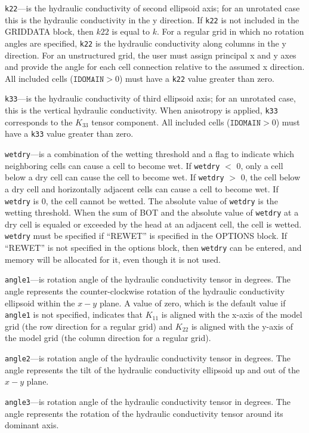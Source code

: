 \item \texttt{k22}---is the hydraulic conductivity of second ellipsoid axis; for an unrotated case this is the hydraulic conductivity in the y direction.  If \texttt{k22} is not included in the GRIDDATA block, then $k22$ is equal to $k$.  For a regular grid in which no rotation angles are specified, \texttt{k22} is the hydraulic conductivity along columns in the y direction. For an unstructured grid, the user must assign principal x and y axes and provide the angle for each cell connection relative to the assumed x direction.  All included cells ($\texttt{IDOMAIN} > 0$) must have a \texttt{k22} value greater than zero.

\item \texttt{k33}---is the hydraulic conductivity of third ellipsoid axis; for an unrotated case, this is the vertical hydraulic conductivity.  When anisotropy is applied, \texttt{k33} corresponds to the $K_{33}$ tensor component.  All included cells ($\texttt{IDOMAIN} > 0$) must have a \texttt{k33} value greater than zero.

\item \texttt{wetdry}---is a combination of the wetting threshold and a flag to indicate which neighboring cells can cause a cell to become wet. If \texttt{wetdry} $<$ 0, only a cell below a dry cell can cause the cell to become wet. If \texttt{wetdry} $>$ 0, the cell below a dry cell and horizontally adjacent cells can cause a cell to become wet. If \texttt{wetdry} is 0, the cell cannot be wetted. The absolute value of \texttt{wetdry} is the wetting threshold. When the sum of BOT and the absolute value of \texttt{wetdry} at a dry cell is equaled or exceeded by the head at an adjacent cell, the cell is wetted.  \texttt{wetdry} must be specified if ``REWET'' is specified in the OPTIONS block.  If ``REWET'' is not specified in the options block, then \texttt{wetdry} can be entered, and memory will be allocated for it, even though it is not used.

\item \texttt{angle1}---is rotation angle of the hydraulic conductivity tensor in degrees.  The angle represents the counter-clockwise rotation of the hydraulic conductivity ellipsoid within the $x-y$ plane.  A value of zero, which is the default value if \texttt{angle1} is not specified, indicates that $K_{11}$ is aligned with the x-axis of the model grid (the row direction for a regular grid) and $K_{22}$ is aligned with the y-axis of the model grid (the column direction for a regular grid).

\item \texttt{angle2}---is rotation angle of the hydraulic conductivity tensor in degrees.  The angle represents the tilt of the hydraulic conductivity ellipsoid up and out of the $x-y$ plane.

\item \texttt{angle3}---is rotation angle of the hydraulic conductivity tensor in degrees.  The angle represents the rotation of the hydraulic conductivity tensor around its dominant axis.


